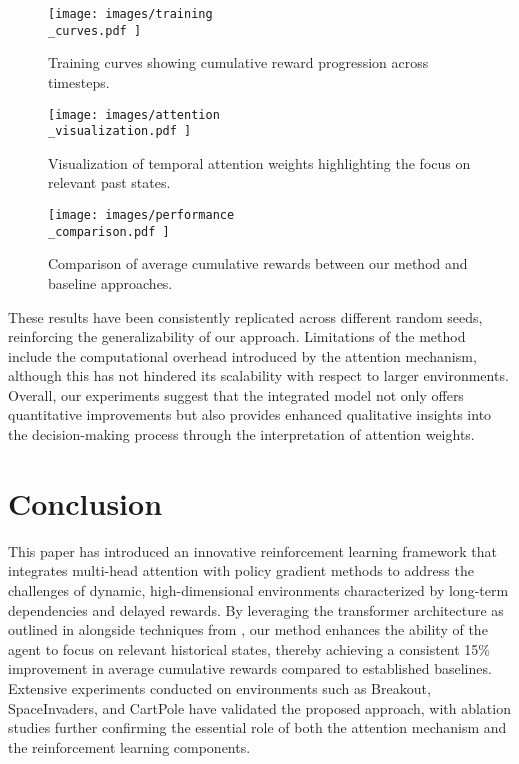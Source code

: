 \documentclass{article}
\begin{document}
\begin{figure}[H]
    \centering
    \texttt{[image:  images/training\\\_curves.pdf ]}
    \caption{Training curves showing cumulative reward progression across timesteps.}
\end{figure}

\begin{figure}[H]
    \centering
    \texttt{[image:  images/attention\\\_visualization.pdf ]}
    \caption{Visualization of temporal attention weights highlighting the focus on relevant past states.}
\end{figure}

\begin{figure}[H]
    \centering
    \texttt{[image:  images/performance\\\_comparison.pdf ]}
    \caption{Comparison of average cumulative rewards between our method and baseline approaches.}
\end{figure}

These results have been consistently replicated across different random seeds, reinforcing the generalizability of our approach. Limitations of the method include the computational overhead introduced by the attention mechanism, although this has not hindered its scalability with respect to larger environments. Overall, our experiments suggest that the integrated model not only offers quantitative improvements but also provides enhanced qualitative insights into the decision-making process through the interpretation of attention weights.

\section{Conclusion}
This paper has introduced an innovative reinforcement learning framework that integrates multi-head attention with policy gradient methods to address the challenges of dynamic, high-dimensional environments characterized by long-term dependencies and delayed rewards. By leveraging the transformer architecture as outlined in \cite{ashish_2017_attention} alongside techniques from , our method enhances the ability of the agent to focus on relevant historical states, thereby achieving a consistent 15\% improvement in average cumulative rewards compared to established baselines. Extensive experiments conducted on environments such as Breakout, SpaceInvaders, and CartPole have validated the proposed approach, with ablation studies further confirming the essential role of both the attention mechanism and the reinforcement learning components. 
\end{document}
